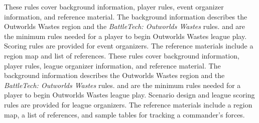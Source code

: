  {
These rules cover background information, player rules, event organizer information, and reference material.
The background information describes the Outworlds Wastes region and the \emph{BattleTech: Outworlds Wastes} rules.
 and  are the minimum rules needed for a player to begin Outworlds Wastes league play.
Scoring rules are provided for event organizers.
The reference materials include a region map and list of references.
} {
These rules cover background information, player rules, league organizer information, and reference material.
The background information describes the Outworlds Wastes region and the \emph{BattleTech: Outworlds Wastes} rules.
 and  are the minimum rules needed for a player to begin Outworlds Wastes league play.
Scenario design and league scoring rules are provided for league organizers.
The reference materials include a region map, a list of references, and sample tables for tracking a commander's forces.
}
